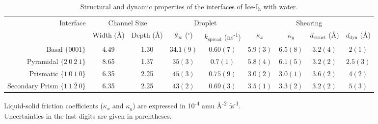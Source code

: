 \documentclass{pnastwo}
\begin{document}




\begin{table}[h]
\centering
\caption{Structural and dynamic properties of the interfaces of
  Ice-I$_\mathrm{h}$ with water.\label{tab:kappa}}
\begin{tabular}{r|cc|cc|cccc}  
\toprule
\multirow{2}{*}{Interface} & \multicolumn{2}{c|}{Channel Size} &\multicolumn{2}{c|}{Droplet} & \multicolumn{4}{c}{Shearing\footnotemark[1]}\\
  & Width (\AA) & Depth (\AA) & $\theta_{\infty}$ ($^\circ$)  & $k_\mathrm{spread}$  (ns\textsuperscript{-1}) &
$\kappa_{x}$  & $\kappa_{y}$ & $d_\mathrm{struct}$ (\AA) &  $d_\mathrm{dyn}$ (\AA) \\ 
\midrule
Basal  $\{0001\}$                    & 4.49 & 1.30 & $34.1(9)$ &$0.60(7)$
& $5.9(3)$ & $6.5(8)$ & $3.2(4)$ & $2(1)$  \\
Pyramidal  $\{2~0~\bar{2}~1\}$       & 8.65 & 1.37 & $35(3)$ &  $0.7(1)$ &
$5.8(4)$ & $6.1(5)$ & $3.2(2)$ & $2.5(3)$\\
Prismatic  $\{1~0~\bar{1}~0\}$       & 6.35 & 2.25 & $45(3)$ & $0.75(9)$ &
$3.0(2)$ & $3.0(1)$ & $3.6(2)$ & $4(2)$ \\
Secondary Prism  $\{1~1~\bar{2}~0\}$ & 6.35 & 2.25 & $43(2)$ & $0.69(3)$ &
$3.5(1)$ & $3.3(2)$ & $3.2(2)$ & $5(3)$ \\ 
\bottomrule
\end{tabular}
\begin{flushleft}
\footnotemark[1]\footnotesize{Liquid-solid friction coefficients ($\kappa_x$ and
  $\kappa_y$) are expressed in 10\textsuperscript{-4} amu
  \AA\textsuperscript{-2} fs\textsuperscript{-1}.} \\
\footnotemark[2]\footnotesize{Uncertainties in
  the last digits are given in parentheses.} 
\end{flushleft}
\end{table}
\end{document}
